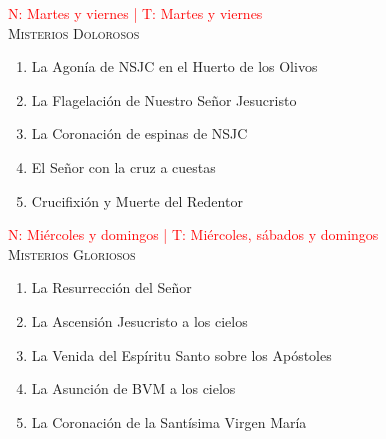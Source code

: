 \documentclass[9pt]{article}
\newcounter{lux-counter}
\begin{document}
\begin{multicols*}{2}
    \subsubsection*{ }
    \begin{flushright}
        \textcolor{red}{}
    \end{flushright}
    \vspace{-2mm}
    \\[1mm]
    

    \vspace{-5mm}

    \subsubsection*{ }
    \begin{flushright}
        \textcolor{red}{}
    \end{flushright}
    \vspace{-2mm}
    \\[1mm]
    


    \small{\textcolor{red}{N: Martes y viernes | T: Martes y viernes}}\\
    \textsc{Misterios Dolorosos}
    \begin{enumerate}
        \item La Agonía de NSJC en el Huerto de los Olivos
        \item La Flagelación de Nuestro Señor Jesucristo
        \item La Coronación de espinas de NSJC
        \item El Señor con la cruz a cuestas
        \item Crucifixión y Muerte del Redentor
    \end{enumerate}

    \vspace{2mm}

    \small{\textcolor{red}{N: Miércoles y domingos | T: Miércoles, sábados y domingos}}\\
    \textsc{Misterios Gloriosos}
    \begin{enumerate}
        \item La Resurrección del Señor
        \item La Ascensión Jesucristo a los cielos
        \item La Venida del Espíritu Santo sobre los Apóstoles
        \item La Asunción de BVM a los cielos
        \item La Coronación de la Santísima Virgen María
    \end{enumerate}


\end{multicols*}
\end{document}
